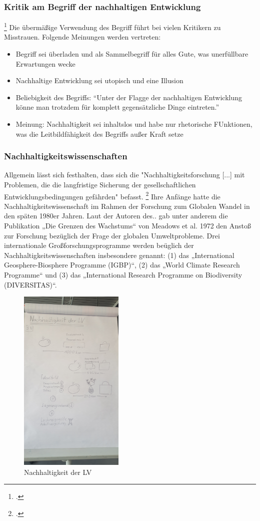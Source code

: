 \documentclass{scrartcl}
\begin{document}
\subsubsection{Kritik am Begriff der nachhaltigen Entwicklung}\footcite{NachhaltigeBrockhaus.de}
Die übermäßige Verwendung des Begriff führt bei vielen Kritikern zu Misstrauen. Folgende Meinungen werden vertreten:

\begin{itemize}
\item Begriff sei überladen und als Sammelbegriff für alles Gute, was unerfüllbare Erwartungen wecke
\item Nachhaltige Entwicklung sei utopisch und eine Illusion
\item Beliebigkeit des Begriffs: “Unter der Flagge der nachhaltigen Entwicklung könne man trotzdem für komplett gegensätzliche Dinge eintreten.”
\item Meinung: Nachhaltigkeit sei inhaltslos und habe nur rhetorische FUnktionen, was die Leitbildfähigkeit des Begriffs außer Kraft setze
\end{itemize}

\subsubsection{Nachhaltigkeitswissenschaften}
Allgemein lässt sich festhalten, dass sich die "Nachhaltigkeitsforschung [...] mit Problemen, die die langfristige Sicherung der gesellschaftlichen Entwicklungsbedingungen gefährden" befasst.  \footcite{MichelsenGrundlagenEntwicklung, S.126}
Ihre Anfänge hatte die Nachhaltigkeitswissenschaft im Rahmen der Forschung zum Globalen Wandel in den späten 1980er Jahren. Laut der Autoren des..  gab unter anderem die Publikation „Die Grenzen des Wachstums“ von Meadows et al. 1972 den Anstoß zur Forschung bezüglich der Frage der globalen Umweltprobleme.
Drei internationale Großforschungsprogramme werden beüglich der Nachhaltigkeitswissenschaften insbesondere genannt: (1) das „International Geosphere-Biosphere Programme (IGBP)“, (2) das „World Climate Research Programme“ und (3) das
„International Research Programme on Biodiversity (DIVERSITAS)“.


\begin{figure}[ht]
\centering
\includegraphics[width=5cm]{image_folder/skizze1.jpg}
\caption{Nachhaltigkeit der LV}
\label{fig:Skizze_Nachhaltigkeit}
\end{figure}
\end{document}
